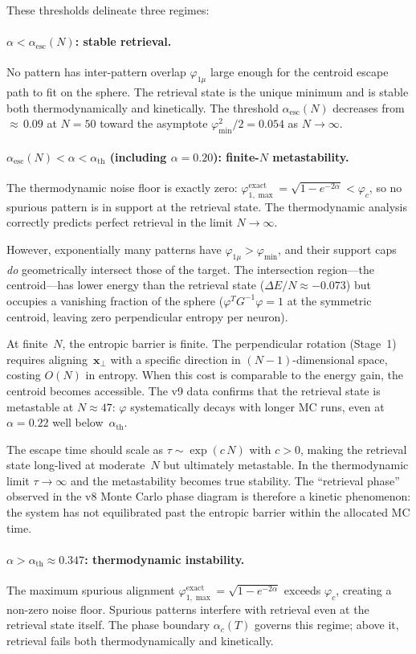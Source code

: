 \documentclass[11pt]{article}
\newcommand{\bx}{\mathbf{x}}
\begin{document}
These thresholds delineate three regimes:

\paragraph{$\alpha < \alpha_{\mathrm{esc}}(N)$: stable retrieval.}
No pattern has inter-pattern overlap $\varphi_{1\mu}$ large enough for the centroid escape path to fit on the sphere.  The retrieval state is the unique minimum and is stable both thermodynamically and kinetically.  The threshold $\alpha_{\mathrm{esc}}(N)$ decreases from ${\approx}\,0.09$ at $N = 50$ toward the asymptote $\varphi_{\min}^2/2 = 0.054$ as $N \to \infty$.

\paragraph{$\alpha_{\mathrm{esc}}(N) < \alpha < \alpha_{\mathrm{th}}$ (including $\alpha = 0.20$): finite-$N$ metastability.}
The thermodynamic noise floor is exactly zero: $\varphi_{1,\max}^{\mathrm{exact}} = \sqrt{1-e^{-2\alpha}} < \varphi_c$, so no spurious pattern is in support at the retrieval state.  The thermodynamic analysis correctly predicts perfect retrieval in the limit $N \to \infty$.

However, exponentially many patterns have $\varphi_{1\mu} > \varphi_{\min}$, and their support caps \emph{do} geometrically intersect those of the target.  The intersection region---the centroid---has lower energy than the retrieval state ($\Delta E/N \approx -0.073$) but occupies a vanishing fraction of the sphere ($\varphi^T G^{-1}\varphi = 1$ at the symmetric centroid, leaving zero perpendicular entropy per neuron).

At finite~$N$, the entropic barrier is finite.  The perpendicular rotation (Stage~1) requires aligning~$\bx_\perp$ with a specific direction in $(N\!-\!1)$-dimensional space, costing $O(N)$ in entropy.  When this cost is comparable to the energy gain, the centroid becomes accessible.  The v9 data confirms that the retrieval state is metastable at $N \approx 47$: $\varphi$ systematically decays with longer MC runs, even at $\alpha = 0.22$ well below~$\alpha_{\mathrm{th}}$.

The escape time should scale as $\tau \sim \exp(c\,N)$ with $c > 0$, making the retrieval state long-lived at moderate~$N$ but ultimately metastable.  In the thermodynamic limit $\tau \to \infty$ and the metastability becomes true stability.  The ``retrieval phase'' observed in the v8 Monte Carlo phase diagram is therefore a kinetic phenomenon: the system has not equilibrated past the entropic barrier within the allocated MC time.

\paragraph{$\alpha > \alpha_{\mathrm{th}} \approx 0.347$: thermodynamic instability.}
The maximum spurious alignment $\varphi_{1,\max}^{\mathrm{exact}} = \sqrt{1-e^{-2\alpha}}$ exceeds $\varphi_c$, creating a non-zero noise floor.  Spurious patterns interfere with retrieval even at the retrieval state itself.  The phase boundary $\alpha_c(T)$ governs this regime; above it, retrieval fails both thermodynamically and kinetically.
\end{document}
